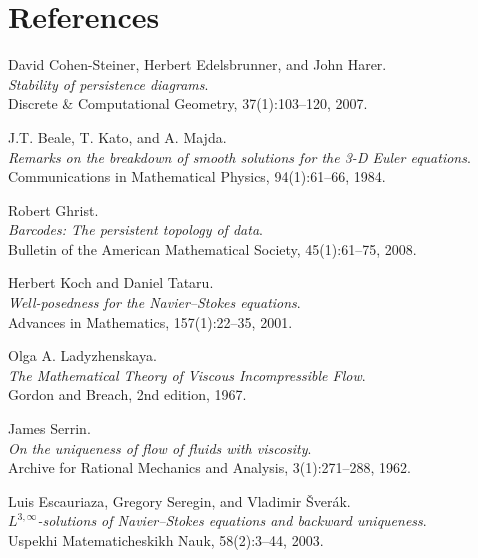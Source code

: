 \documentclass[11pt]{article}
\theoremstyle{definition}
\begin{document}
\section*{References}
\begin{thebibliography}{9}

David Cohen-Steiner, Herbert Edelsbrunner, and John Harer.\\
\textit{Stability of persistence diagrams}.\\
Discrete \& Computational Geometry, 37(1):103--120, 2007.

J.T. Beale, T. Kato, and A. Majda.\\
\textit{Remarks on the breakdown of smooth solutions for the 3-D Euler equations}.\\
Communications in Mathematical Physics, 94(1):61--66, 1984.

Robert Ghrist.\\
\textit{Barcodes: The persistent topology of data}.\\
Bulletin of the American Mathematical Society, 45(1):61--75, 2008.

Herbert Koch and Daniel Tataru.\\
\textit{Well-posedness for the Navier–Stokes equations}.\\
Advances in Mathematics, 157(1):22--35, 2001.

Olga A. Ladyzhenskaya.\\
\textit{The Mathematical Theory of Viscous Incompressible Flow}.\\
Gordon and Breach, 2nd edition, 1967.

James Serrin.\\
\textit{On the uniqueness of flow of fluids with viscosity}.\\
Archive for Rational Mechanics and Analysis, 3(1):271--288, 1962.

Luis Escauriaza, Gregory Seregin, and Vladimir \v{S}ver\'ak.\\
\textit{$L^{3,\infty}$-solutions of Navier–Stokes equations and backward uniqueness}.\\
Uspekhi Matematicheskikh Nauk, 58(2):3--44, 2003.

\end{thebibliography}
\end{document}

